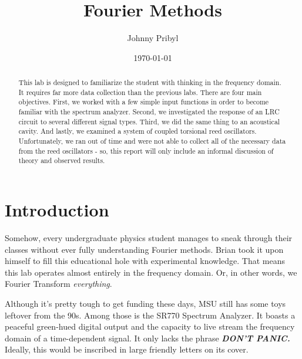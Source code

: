 \documentclass{article}
\date{\today} %
\begin{document}
\title{Fourier Methods}
\author{Johnny Pribyl}
\maketitle

\begin{abstract}

    This lab is designed to familiarize the student with thinking in the
    frequency domain. It requires far more data collection than the previous
    labs. There are four main objectives. First, we worked with a few simple
    input functions in order to become familiar with the spectrum analyzer.
    Second, we investigated the response of an LRC circuit to several different
    signal types. Third, we did the same thing to an acoustical cavity. And
    lastly, we examined a system of coupled torsional reed oscillators.
    Unfortunately, we ran out of time and were not able to collect all of the
    necessary data from the reed oscillators - so, this report will only
    include an informal discussion of theory and observed results.
    
\end{abstract}



\section{Introduction}

Somehow, every undergraduate physics student manages to sneak through their
classes without ever fully understanding Fourier methods. Brian took it upon
himself to fill this educational hole with experimental knowledge. That means
this lab operates almost entirely in the frequency domain. Or, in other words,
we Fourier Transform \textit{everything}.

Although it's pretty tough to get funding these days, MSU still has some toys
leftover from the 90s. Among those is the SR770 Spectrum Analyzer. It boasts a
peaceful green-hued digital output and the capacity to live stream the
frequency domain of a time-dependent signal. It only lacks the phrase
\textit{\textbf{DON'T PANIC.}} Ideally, this would be inscribed in large
friendly letters on its cover.
\end{document}
